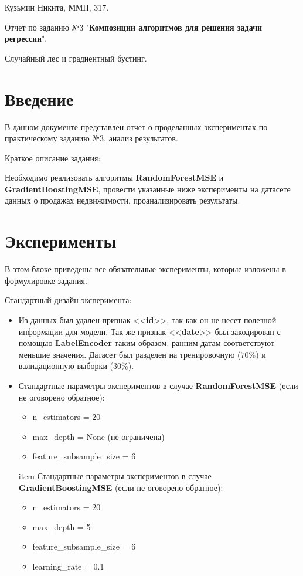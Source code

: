 \documentclass[a4paper, 11pt]{article}
\begin{document}
    \hfill Кузьмин Никита, ММП, 317.
    
    \begin{center} \Large Отчет по заданию №3 "\textbf{Композиции алгоритмов для решения задачи регрессии}".
        
         Случайный лес и градиентный бустинг.
    \end{center}
    \tableofcontents
    \newpage
    \section{Введение}
        В данном документе представлен отчет о проделанных экспериментах по практическому заданию №3, анализ результатов. 
        
        Краткое описание задания: 
        
        
        Необходимо реализовать алгоритмы \textbf{RandomForestMSE} и \textbf{GradientBoostingMSE}, провести указанные ниже эксперименты на датасете данных о продажах недвижимости, проанализировать результаты.
   \section{Эксперименты}
   
   В этом блоке приведены все обязательные эксперименты, которые изложены в формулировке задания.
   
   Стандартный дизайн эксперимента: 
   \begin{itemize}
       \item Из данных был удален признак <<\textbf{id}>>, так как он не несет полезной информации для модели. Так же признак <<\textbf{date}>> был закодирован с помощью \textbf{LabelEncoder} таким образом: ранним датам соответствуют меньшие значения. Датасет был разделен на тренировочную ($70\%$) и валидационную выборки ($30\%$).
       \item Стандартные параметры экспериментов в случае \textbf{RandomForestMSE} (если не оговорено обратное):
       \begin{itemize}
           \item n\_estimators = 20
           \item max\_depth = None (не ограничена)
           \item feature\_subsample\_size = 6
       \end{itemize}
       item Стандартные параметры экспериментов в случае \textbf{GradientBoostingMSE} (если не оговорено обратное):
       \begin{itemize}
           \item n\_estimators = 20
           \item max\_depth = 5
           \item feature\_subsample\_size = 6
           \item learning\_rate = 0.1
       \end{itemize}
   \end{itemize}
    
\end{document}
